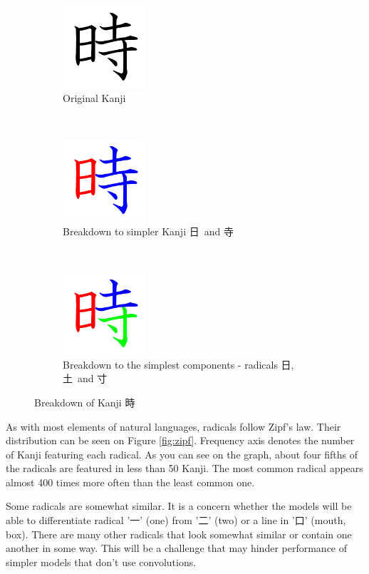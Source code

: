 \documentclass{article}
\begin{document}
\begin{CJK*}{UTF8}{min}
\begin{figure}[h]
    \centering
    \begin{subfigure}[b]{0.3\textwidth}
        \centering
        \includegraphics[height=1.2in]{toki}
        \caption{Original Kanji}
        \label{fig:toki-a}
    \end{subfigure}%
    ~
    \begin{subfigure}[b]{0.3\textwidth}
        \centering
        \includegraphics[height=1.2in]{toki-two}
        \caption{Breakdown to simpler Kanji 日\ and 寺}
        \label{fig:toki-b}
    \end{subfigure}
    ~
    \begin{subfigure}[b]{0.3\textwidth}
        \centering
        \includegraphics[height=1.2in]{toki-all}
        \caption{Breakdown to the simplest components - radicals 日, 土\ and 寸}
        \label{fig:toki-c}
    \end{subfigure}
    \caption{Breakdown of Kanji 時}
    \label{fig:toki}
\end{figure}

As with most elements of natural languages, radicals follow Zipf's law. Their distribution can be seen on Figure \ref{fig:zipf}. Frequency axis denotes the number of Kanji featuring each radical. As you can see on the graph, about four fifths of the radicals are featured in less than 50 Kanji. The most common radical appears almost 400 times more often than the least common one.

Some radicals are somewhat similar. It is a concern whether the models will be able to differentiate radical '一' (one) from '二' (two) or a line in '口' (mouth, box). There are many other radicals that look somewhat similar or contain one another in some way. This will be a challenge that may hinder performance of simpler models that don't use convolutions.


\end{CJK*}
\end{document}
